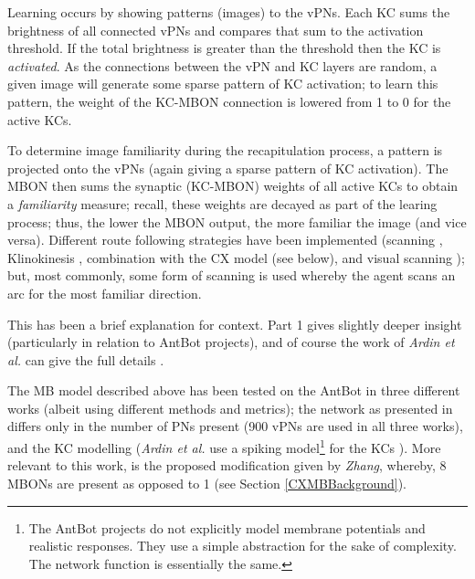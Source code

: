\documentclass[a4paper,11pt,twoside,openright]{article}
\begin{document}
Learning occurs by showing patterns (images) to the vPNs. Each KC sums the
brightness of all connected vPNs and compares that sum to the activation
threshold. If the total brightness is greater than the threshold then the KC is
\textit{activated}. As the connections between the vPN and KC layers are random,
a given image will generate some sparse pattern of KC activation; to learn this
pattern, the weight of the KC-MBON connection is lowered from 1 to 0 for the
active KCs.
\newline
\par

To determine image familiarity during the recapitulation process, a pattern is
projected onto the vPNs (again giving a sparse pattern of KC activation).
The MBON then sums the synaptic (KC-MBON) weights of all active KCs to obtain a
\textit{familiarity} measure; recall, these weights are decayed as part of the
learing process; thus, the lower the MBON output, the more familiar the image
(and vice versa). Different route following strategies have been implemented
(scanning \cite{Ardin2016, Eberding2016, Zhang2017}, Klinokinesis
\cite{Zhang2017}, combination with the CX model \cite{Zhang2017}(see below), and
visual scanning \cite{Mitchell2018}); but, most commonly, some form of scanning
is used whereby the agent scans an arc for the most familiar direction.
\newline
\par

This has been a brief explanation for context. Part 1 gives slightly deeper
insight\cite{Mitchell2018} (particularly in relation to AntBot projects), and of
course the work of \textit{Ardin et al.} can give the full details
\cite{Ardin2016}.
\newline
\par

The MB model described above has been tested on the AntBot in three different
works (albeit using different methods and metrics); the network as presented in
\cite{Eberding2016, Zhang2017, Mitchell2018} differs only in the number of PNs
present (900 vPNs are used in all three works), and the KC
modelling (\textit{Ardin et al.} use a spiking model\footnote{The AntBot
  projects do not explicitly model membrane potentials and realistic responses.
  They use a simple abstraction for the sake of complexity. The network function
  is essentially the same.} for the KCs
\cite{Ardin2016}). More relevant to this work, is
the proposed modification given by \textit{Zhang}, whereby, 8 MBONs are present
as opposed to 1 (see Section \ref{CXMBBackground}).
\newline
\par
\end{document}
